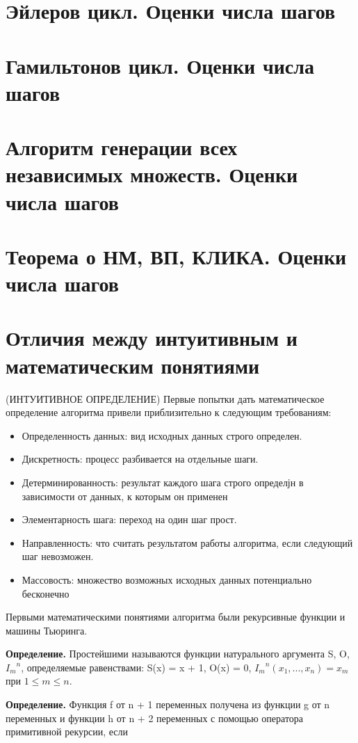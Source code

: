 \documentclass[40pt]{article}
\begin{document}
\section{Эйлеров цикл.  Оценки числа шагов}
\section{Гамильтонов цикл.  Оценки числа шагов}
\section{Алгоритм генерации всех независимых множеств.  Оценки числа шагов}
\section{Теорема о НМ, ВП, КЛИКА.  Оценки числа шагов}
\section{Отличия между интуитивным и математическим понятиями}
(ИНТУИТИВНОЕ ОПРЕДЕЛЕНИЕ)
Первые попытки дать математическое определение алгоритма
привели приблизительно к следующим требованиям:
\begin{itemize}
    \item Определенность данных: вид исходных данных строго определен.
    \item Дискретность: процесс разбивается на отдельные шаги.
    \item Детерминированность: результат каждого шага строго определјн в зависимости от данных, к которым он применен
    \item Элементарность шага: переход на один шаг прост.
    \item Направленность: что считать результатом работы алгоритма,
если следующий шаг невозможен.
    \item Массовость: множество возможных исходных данных потенциально бесконечно
\end{itemize}

Первыми математическими понятиями
алгоритма были рекурсивные функции и машины Тьюринга.

\textbf{Определение.} Простейшими называются функции натурального аргумента S, O, ${I_m}^n$, определяемые равенствами: S(x) = x + 1,
O(x) = 0, ${I_m}^n(x_1, . . . , x_n) = x_m$ при $1 \leq m \leq n$.

\textbf{Определение.} Функция f от n + 1 переменных получена из
функции g от n переменных и функции h от n + 2 переменных с
помощью оператора примитивной рекурсии, если 
\end{document}
